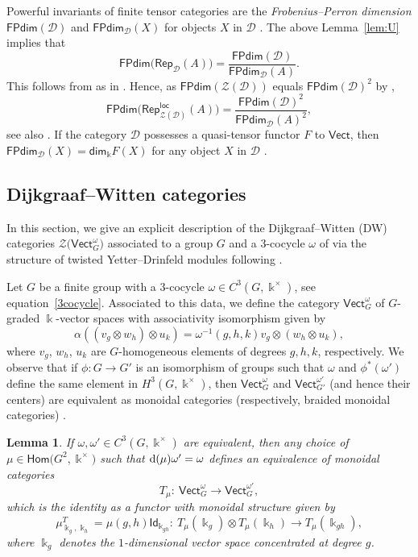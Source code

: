 \documentclass[pdftex]{sigma}
\numberwithin{equation}{section}
\newtheorem{Lemma}[Theorem]{Lemma}
\newcommand{\deri}{{\rm d}}
\newcommand{\Hom}{\mathsf{Hom}}
\newcommand{\ide}{\mathsf{Id}}
\newcommand{\FPdim}{\mathsf{FPdim}}
\renewcommand{\dim}{\mathsf{dim}}
\newcommand{\Rep}{\mathsf{Rep}}
\newcommand{\locmod}{\mathsf{Rep}^{\mathsf{loc}}}
\newcommand{\Vect}{\mathsf{Vect}}
\newcommand{\cD}{\mathcal{D}}
\newcommand{\cZ}{\mathcal{Z}}
\begin{document}
Powerful invariants of finite tensor categories are the \emph{Frobenius--Perron dimension} $\FPdim(\cD)$ and $\FPdim_\cD(X)$ for objects $X$ in $\cD$ \cite[Section~4.5]{EGNO}. The above Lemma~\ref{lem:U} implies that
\begin{equation}\label{eq:FPdim-Rep}
\FPdim \big(\Rep_{\cD}(A)\big)=\frac{\FPdim(\cD)}{\FPdim_\cD(A)}.
\end{equation}
This follows from \cite[Lemma~6.2.4]{EGNO} as in \cite[Lemma 4.5]{LW3}. Hence, as $\FPdim(\cZ(\cD))$ equals $\FPdim(\cD)^2$ by \cite[Theorem~7.16.6]{EGNO},
\[
\FPdim \big(\locmod_{\cZ(\cD)}(A)\big)=\frac{\FPdim(\cD)^2}{\FPdim_\cD(A)^2},
\]
see also \cite[Corollary~4.1]{DMNO}. If the category $\cD$ possesses a quasi-tensor functor $F$ to $\Vect$, then $\FPdim_{\cD}(X)=\dim_\Bbbk F(X)$ for any object $X$ in $\cD$ \cite[Proposition~4.5.7]{EGNO}.


\subsection{Dijkgraaf--Witten categories}
In this section, we give an explicit description of the Dijkgraaf--Witten (DW) categories $\cZ\big(\Vect_G^\omega\big)$ associated to a group $G$ and a $3$-cocycle $\omega$ of \cite{DPR} via the structure of twisted Yetter--Drinfeld modules following \cite[Proposition~3.2]{Maj98}.

Let $G$ be a finite group with a $3$-cocycle $\omega\in C^3(G,\Bbbk^\times)$, see equation~\eqref{3cocycle}.
Associated to this data, we define the category $\Vect_G^\omega$ of $G$-graded $\Bbbk$-vector spaces with associativity isomorphism given by \[\alpha((v_g\otimes w_h)\otimes u_k)=\omega^{-1}(g,h,k)v_g\otimes (w_h\otimes u_k),\]
where $v_g$, $w_h$, $u_k$ are $G$-homogeneous elements of degrees $g,h,k$, respectively. We observe that if $\phi\colon G\to G'$ is an isomorphism of groups such that $\omega$ and $\phi^{*}(\omega')$ define the same element in $H^3(G,\Bbbk^\times)$, then $\Vect_G^\omega$ and $\Vect_{G'}^{\omega'}$ (and hence their centers) are equivalent as monoidal categories (respectively, braided monoidal categories) \cite[Section~2.6]{EGNO}.

\begin{Lemma}\label{lem:omega-equiv}
If $\omega,\omega'\in C^3(G,\Bbbk^\times)$ are equivalent, then any choice of $\mu\in \Hom\big(G^2,\Bbbk^\times\big)$ such that $\deri(\mu)\omega'=\omega$ defines an equivalence of monoidal categories
\[T_\mu\colon\ \Vect^\omega_G\to \Vect_G^{\omega'},\]
which is the identity as a functor with monoidal structure given by
\[\mu^{T}_{\Bbbk_g,\Bbbk_h}=\mu(g,h)\ide_{\Bbbk_{gh}}\colon\ T_\mu(\Bbbk_g)\otimes T_\mu(\Bbbk_h)\to T_\mu(\Bbbk_{gh}),\]
where $\Bbbk_g$ denotes the $1$-dimensional vector space concentrated at degree $g$.
\end{Lemma}
\end{document}
